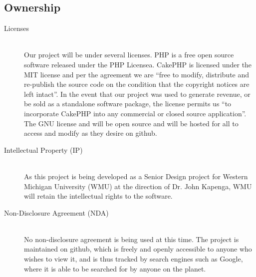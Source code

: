 \documentclass{report}
\begin{document}
\subsection*{Ownership}
\begin{description}
\item [Licenses] \hfill \\
Our project will be under several licenses. PHP is a free open source software released under the PHP Licensea.
CakePHP is licensed under the MIT license and per the agreement we are “free to modify, distribute and re-publish the source code on the condition that the copyright notices are left intact”.
In the event that our project was used to generate revenue, or be sold as a standalone software package, the license permits us “to incorporate CakePHP into any commercial or closed source application”.  
The GNU license and will be open source and will be hosted for all to access and modify as they desire on github.
\item [Intellectual Property (IP)] \hfill \\
As this project is being developed as a Senior Design project for Western Michigan University (WMU) at the direction of Dr. John Kapenga, WMU will retain the intellectual rights to the software.
\item [Non-Disclosure Agreement (NDA)] \hfill \\
No non-disclosure agreement is being used at this time.  The project is maintained on github, which is freely and openly accessible to anyone who wishes to view it, and is thus tracked by search engines such as Google, where it is able to be searched for by anyone on the planet.
\end{description}
\end{document}
